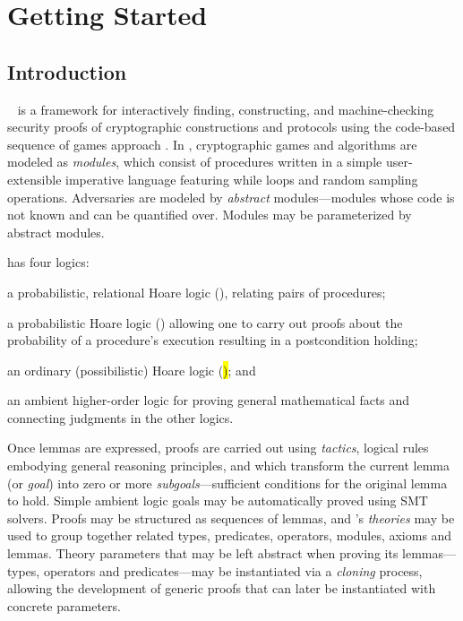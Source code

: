 \chapter{Getting Started}
\label{chap:started}

\section{Introduction}

\EasyCrypt~\cite{barthe-easycrypt-intro-2014,barthe-crypto-2011} is a
framework for interactively finding, constructing, and
machine-checking security proofs of cryptographic constructions and
protocols using the code-based sequence of games approach
\cite{bellare-rogaway-code-based-2004,%
  bellare-rogaway-triple-enc-2006,shoup-seq-games-2004}. In
\EasyCrypt, cryptographic games and algorithms are modeled as
\emph{modules}, which consist of procedures written in a simple
user-extensible imperative language featuring while loops and random
sampling operations. Adversaries are modeled by \emph{abstract}
modules---modules whose code is not known and can be quantified
over. Modules may be parameterized by abstract modules.

\EasyCrypt has four logics:
\begin{inparaitem}[]
\item a probabilistic, relational Hoare logic (\prhl), relating pairs
  of procedures;
\item a probabilistic Hoare logic (\phl) allowing one to carry out
  proofs about the probability of a procedure's execution resulting in
  a postcondition holding;
\item an ordinary (possibilistic) Hoare logic (\hl); and
\item an ambient higher-order logic for proving general mathematical
  facts and connecting judgments in the other logics.
\end{inparaitem}
Once lemmas are expressed, proofs are carried out using
\emph{tactics}, logical rules embodying general reasoning principles,
and which transform the current lemma (or \emph{goal}) into zero or
more \emph{subgoals}---sufficient conditions for the original lemma to
hold. Simple ambient logic goals may be automatically proved using SMT
solvers. Proofs may be structured as sequences of lemmas, and
\EasyCrypt's \emph{theories} may be used to group together related
types, predicates, operators, modules, axioms and lemmas. Theory
parameters that may be left abstract when proving its lemmas---types,
operators and predicates---may be instantiated via a \emph{cloning}
process, allowing the development of generic proofs that can later be
instantiated with concrete parameters.

